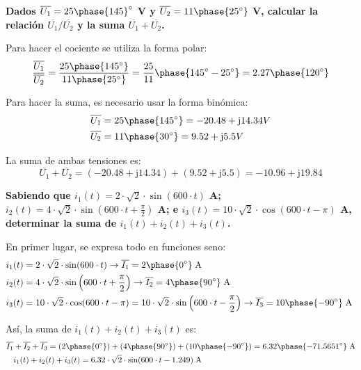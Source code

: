 \vspace{4mm}
\begin{example}
  \textbf{Dados $\overline{U_1}=25\phase{145}^\circ$ V y
    $\overline{U_2}=11\phase{25^\circ}$ V, calcular la relación
    $\overline{U_1}/\overline{U_2}$ y la suma
    $\overline{U_1}+\overline{U_2}$.}
		
  Para hacer el cociente se utiliza la forma polar:
  \begin{equation*}
    \dfrac{\overline{U_1}}{\overline{U_2}}=\dfrac{25\phase{145^\circ}}{11\phase{25^\circ}}=\dfrac{25}{11}\phase{145^\circ-25^\circ}=2.27\phase{120^\circ}
  \end{equation*}
		
  Para hacer la suma, es necesario usar la forma binómica:
  \begin{align*}
    \overline{U_1}&=25\phase{145^\circ}=-20.48+\mathrm{j} 14.34 V\\
    \overline{U_2}&=11\phase{30^\circ}=9.52+\mathrm{j} 5.5 V
  \end{align*}
		
  La suma de ambas tensiones es:
  \begin{equation*}
    \overline{U_1}+\overline{U_2}=(-20.48+\mathrm{j}14.34)+(9.52+\mathrm{j}5.5)=-10.96+\mathrm{j}19.84
  \end{equation*}
\end{example}
	
\vspace{4mm}
\begin{example}
  \textbf{Sabiendo que $i_1(t)=2\cdot\sqrt{2}\cdot \sin(600\cdot t)$
    A;
    $i_2(t)=4\cdot\sqrt{2}\cdot \sin\left(600\cdot
      t+\frac{\pi}{2}\right)$ A; e
    $i_3(t)=10\cdot\sqrt{2}\cdot \cos(600\cdot t-\pi)$ A, determinar
    la suma de $i_1(t)+i_2(t)+i_3(t)$.}
		
  En primer lugar, se expresa todo en funciones seno:
  \begin{align*}
    i_1(t)&=2\cdot\sqrt{2}\cdot \sin(600\cdot t)\rightarrow \overline{I_1}=2\phase{0^\circ}\;\text{A}\\
    i_2(t)&=4\cdot\sqrt{2}\cdot \sin\left(600\cdot t+\frac{\pi}{2}\right)\rightarrow \overline{I_2}=4\phase{90^\circ}\;\text{A}\\
    i_3(t)&=10\cdot\sqrt{2}\cdot \cos(600\cdot t-\pi)=10\cdot\sqrt{2}\cdot \sin\left(600\cdot t-\frac{\pi}{2}\right)\rightarrow \overline{I_3}=10\phase{-90^\circ}\;\text{A}\
  \end{align*}
		
  Así, la suma de $i_1(t)+i_2(t)+i_3(t)$ es:
  \begin{align*}
    \overline{I_1}&+\overline{I_2}+\overline{I_3}=(2\phase{0^\circ})+(4\phase{90^\circ})+(10\phase {-90^\circ})=6.32\phase{-71.5651^\circ}\;\text{A} \\
                  &i_1(t)+i_2(t)+i_3(t)=6.32\cdot\sqrt{2}\cdot \sin(600\cdot t-1.249)\;\text{A}
  \end{align*}
\end{example}
	
